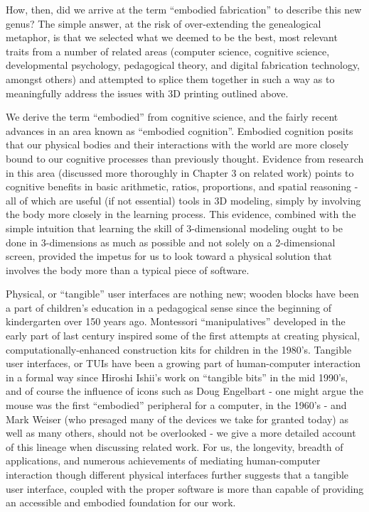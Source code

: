 How, then, did we arrive at the term ``embodied fabrication'' to describe this
new genus? The simple answer, at the risk of over-extending the genealogical
metaphor, is that we selected what we deemed to be the best, most relevant
traits from a number of related areas (computer science, cognitive science,
developmental psychology, pedagogical theory, and digital fabrication
technology, amongst others) and attempted to splice them together in such a way
as to meaningfully address the issues with 3D printing outlined above. 

We derive the term ``embodied'' from cognitive science, and the fairly recent
advances in an area known as ``embodied cognition''. Embodied cognition posits
that our physical bodies and their interactions with the world are more closely
bound to our cognitive processes than previously thought. Evidence from research
in this area (discussed more thoroughly in Chapter 3 on related work) points to
cognitive benefits in basic arithmetic, ratios, proportions, and spatial
reasoning - all of which are useful (if not essential) tools in 3D modeling,
simply by involving the body more closely in the learning process.
This evidence, combined with the simple intuition that learning the skill of
3-dimensional modeling ought to be done in 3-dimensions as much as possible and
not solely on a 2-dimensional screen, provided the impetus for us to look toward
a physical solution that involves the body more than a typical piece
of software.

Physical, or ``tangible'' user interfaces are nothing new; wooden blocks have
been a part of children's education in a pedagogical sense since the beginning
of kindergarten over 150 years ago\cite{froebel}. Montessori ``manipulatives''
developed in the early part of last century inspired some of the first attempts
at creating physical, computationally-enhanced construction kits for children in
the 1980's\cite{Resnick:1998:DMN:274644.274684}. Tangible user interfaces, or
TUIs have been a growing part of human-computer interaction in a formal way
since Hiroshi Ishii's work on ``tangible
bits''\cite{Ishii:1997:TBT:258549.258715} in the mid 1990's, and of course the
influence of icons such as Doug Engelbart\cite{engelbart1968research} - one
might argue the mouse was the first ``embodied'' peripheral for a computer, in
the 1960's - and Mark Weiser\cite{weiser1991computer} (who presaged many of the
devices we take for granted today) as well as many others, should not be
overlooked - we give a more detailed account of this lineage when discussing
related work. For us, the longevity, breadth of applications, and numerous
achievements of mediating human-computer interaction though different physical
interfaces further suggests that a tangible user interface, coupled with the
proper software is more than capable of providing an accessible and embodied
foundation for our work.

